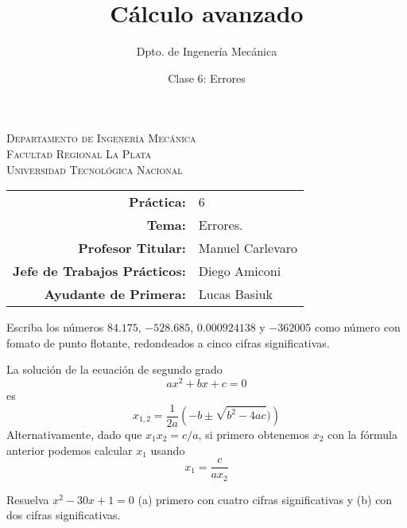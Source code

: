\documentclass[11pt]{article}
\title{Cálculo avanzado}
\author{Dpto. de Ingenería Mecánica}
\date{Clase 6: Errores}
\begin{document}

\begin{center}
\end{center} 

\begin{center}
\vspace{\baselineskip}
\Large{\textsc{Departamento de Ingenería Mecánica}} \\
\textsc{Facultad Regional La Plata} \\
\textsc{Universidad Tecnológica Nacional}
\end{center}


\begin{center}
\begin{tabular}{r l}
    \textbf{Práctica:} & 6 \\
 \textbf{Tema:} & Errores. \\
 \textbf{Profesor Titular:} & Manuel Carlevaro \\
 \textbf{Jefe de Trabajos Prácticos:} & Diego Amiconi \\
 \textbf{Ayudante de Primera:} & Lucas Basiuk 
\end{tabular}\end{center}

\vspace{1em}

\begin{question} %
    Escriba los números $84.175$, $-528.685$, $0.000924138$ y $-362005$ como número con fomato de punto flotante, redondeados a cinco cifras significativas.
\end{question}

\begin{question}  %
La solución de la ecuación de segundo grado
\[ a x^2 + b x + c = 0 \]
es
\[ x_{1,2} = \frac{1}{2a} \left( -b \pm \sqrt{b^2 - 4 a c}) \right) \]
Alternativamente, dado que $x_1 x_2 = c/a$, si primero obtenemos $x_2$ con la fórmula anterior podemos calcular $x_1$ usando
\[ x_1 = \frac{c}{a x_2} \]

Resuelva $x^2 - 30 x + 1 = 0$ (a) primero con cuatro cifras significativas y (b) con dos cifras significativas.
\end{question}
\end{document}
